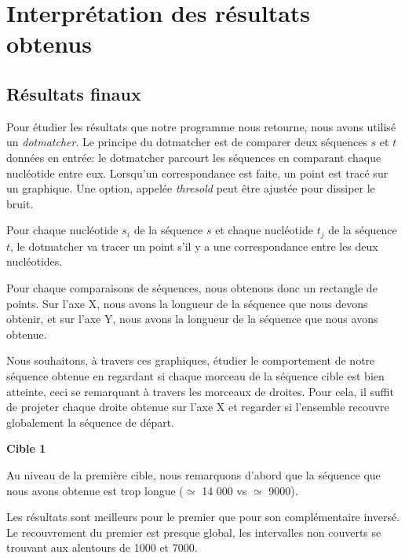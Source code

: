
\section{Interprétation des résultats obtenus}

\subsection{Résultats finaux}

Pour étudier les résultats que notre programme nous retourne, nous avons utilisé
un \textit{dotmatcher}.
Le principe du dotmatcher est de comparer deux séquences $s$ et $t$ données en
entrée: le dotmatcher parcourt les séquences en comparant chaque nucléotide
entre eux.  Lorsqu'un correspondance est faite, un point est tracé sur un
graphique. Une option, appelée \textit{thresold} peut être ajustée pour dissiper
le bruit.

\FloatBarrier



Pour chaque nucléotide $s_{i}$ de la séquence $s$ et chaque nucléotide $t_{j}$
de la séquence $t$, le dotmatcher va tracer un point s'il y a une correspondance
entre les deux nucléotides.

Pour chaque comparaisons de séquences, nous obtenons donc un rectangle de
points. Sur l'axe X, nous avons la longueur de la séquence que nous devons
obtenir, et sur l'axe Y, nous avons la longueur de la séquence que nous avons
obtenue.

Nous souhaitons, à travers ces graphiques, étudier le comportement de notre
séquence obtenue en regardant si chaque morceau de la séquence cible est bien
atteinte, ceci se remarquant à travers les morceaux de droites. Pour cela, il
suffit de projeter chaque droite obtenue sur l'axe X et regarder si l'ensemble
recouvre globalement la séquence de départ.

\noindent\textbf{Cible 1}

Au niveau de la première cible, nous remarquons d'abord que la séquence que nous
avons obtenue est trop longue ($\simeq$ 14 000 vs $\simeq$ 9000).

Les résultats sont meilleurs pour le premier que pour son complémentaire
inversé. Le recouvrement du premier est presque global, les intervalles non
couverts se trouvant aux alentours de 1000 et 7000.


